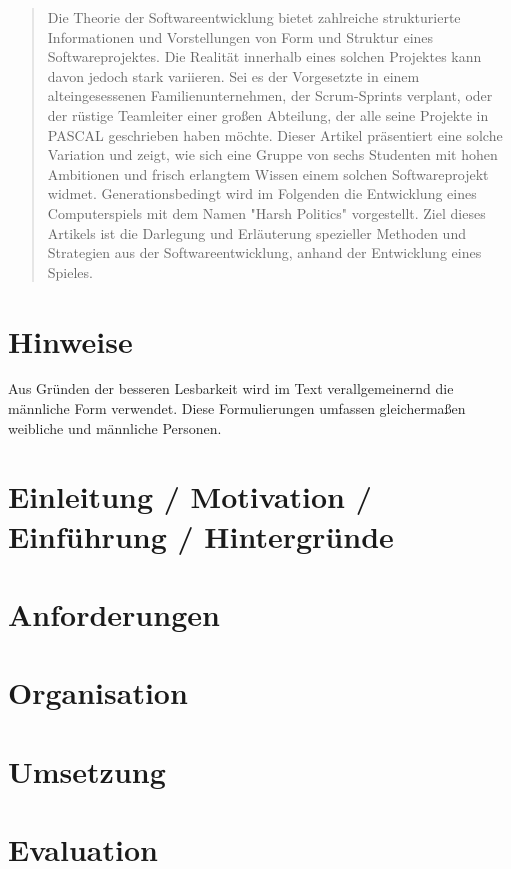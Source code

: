 \documentclass[conference]{IEEEtran}
\begin{document}
\begin{abstract}
Die Theorie der Softwareentwicklung bietet zahlreiche strukturierte Informationen und Vorstellungen von Form und Struktur eines Softwareprojektes. Die Realität innerhalb eines solchen Projektes kann davon jedoch stark variieren. Sei es der Vorgesetzte in einem alteingesessenen Familienunternehmen, der Scrum-Sprints verplant, oder der rüstige Teamleiter einer großen Abteilung, der alle seine Projekte in PASCAL geschrieben haben möchte. Dieser Artikel präsentiert eine solche Variation und zeigt, wie sich eine Gruppe von sechs Studenten mit hohen Ambitionen und frisch erlangtem Wissen einem solchen Softwareprojekt widmet. Generationsbedingt wird im Folgenden die Entwicklung eines Computerspiels mit dem Namen "Harsh Politics" vorgestellt. Ziel dieses Artikels ist die Darlegung und Erläuterung spezieller Methoden und Strategien aus der Softwareentwicklung, anhand der Entwicklung eines Spieles.
\end{abstract}

\section{Hinweise}
Aus Gründen der besseren Lesbarkeit wird im Text verallgemeinernd die männliche Form verwendet.
Diese Formulierungen umfassen gleichermaßen weibliche und männliche Personen.
\section{Einleitung / Motivation / Einführung / Hintergründe}


\section{Anforderungen}


\section{Organisation}


\section{Umsetzung}


\section{Evaluation}

\end{document}
